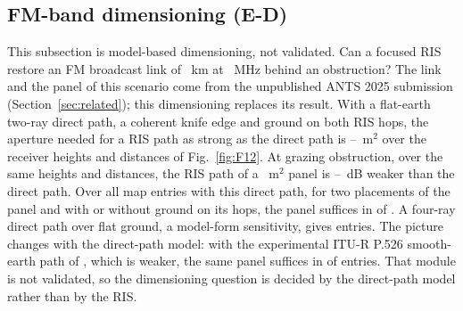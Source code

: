 

\subsection{FM-band dimensioning (E-D)}\label{sec:cases-ed}
This subsection is model-based dimensioning, not validated. Can a focused RIS
restore an FM broadcast link of \numFmLinkKm~km at \numFmFreqMHz~MHz behind an obstruction?
The link and the panel of this scenario come from the
unpublished ANTS 2025 submission (Section~\ref{sec:related}); this dimensioning replaces its
result. With a flat-earth two-ray direct path, a coherent knife edge and ground on both RIS hops, the
aperture needed for a RIS path as strong as the direct path is \numFmAreqMin--\numFmAreqMax~m$^2$
over the receiver heights and distances of Fig.~\ref{fig:F12}. At grazing obstruction, over the
same heights and distances, the RIS path of a \numFmPanelMtwo~m$^2$ panel is
\numFmGapMinDb--\numFmGapMaxDb~dB weaker than the direct path. Over all map entries with this direct path, for two placements of the panel and
with or without ground on its hops, the panel suffices in \numFmPrimarySufficient{} of
\numFmPrimaryEntries{}. A four-ray direct path over flat ground, a model-form sensitivity,
gives \numFmFourRaySufficient{} entries. The picture changes with the direct-path model: with the
experimental ITU-R P.526 smooth-earth path of \sremu{}, which is weaker, the same panel suffices in
\numFmPfiveSufficient{} of \numFmPfiveEntries{} entries. That module is not validated, so the
dimensioning question is decided by the direct-path model rather than by the RIS.

\begin{figure}[t]
\centering
{}
\end{figure}

